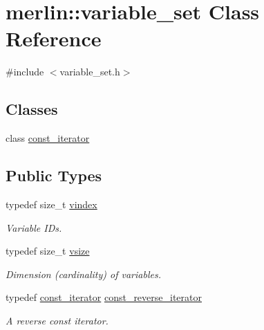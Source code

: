 \hypertarget{classmerlin_1_1variable__set}{}\section{merlin\+:\+:variable\+\_\+set Class Reference}
\label{classmerlin_1_1variable__set}


{\ttfamily \#include $<$variable\+\_\+set.\+h$>$}

\subsection*{Classes}
\begin{DoxyCompactItemize}
\item 
class \hyperlink{classmerlin_1_1variable__set_1_1const__iterator}{const\+\_\+iterator}
\end{DoxyCompactItemize}
\subsection*{Public Types}
\begin{DoxyCompactItemize}
\item 
typedef size\+\_\+t \hyperlink{classmerlin_1_1variable__set_a2dadc030390168fc0656308250716634}{vindex}\hypertarget{classmerlin_1_1variable__set_a2dadc030390168fc0656308250716634}{}\label{classmerlin_1_1variable__set_a2dadc030390168fc0656308250716634}

\begin{DoxyCompactList}\small\item\em Variable I\+Ds. \end{DoxyCompactList}\item 
typedef size\+\_\+t \hyperlink{classmerlin_1_1variable__set_a05d7a8291564fa7fb236a5e9cb65c734}{vsize}\hypertarget{classmerlin_1_1variable__set_a05d7a8291564fa7fb236a5e9cb65c734}{}\label{classmerlin_1_1variable__set_a05d7a8291564fa7fb236a5e9cb65c734}

\begin{DoxyCompactList}\small\item\em Dimension (cardinality) of variables. \end{DoxyCompactList}\item 
typedef \hyperlink{classmerlin_1_1variable__set_1_1const__iterator}{const\+\_\+iterator} \hyperlink{classmerlin_1_1variable__set_a4d523eb96935f7215e5b6f2e968f7f0a}{const\+\_\+reverse\+\_\+iterator}\hypertarget{classmerlin_1_1variable__set_a4d523eb96935f7215e5b6f2e968f7f0a}{}\label{classmerlin_1_1variable__set_a4d523eb96935f7215e5b6f2e968f7f0a}

\begin{DoxyCompactList}\small\item\em A reverse const iterator. \end{DoxyCompactList}\end{DoxyCompactItemize}
